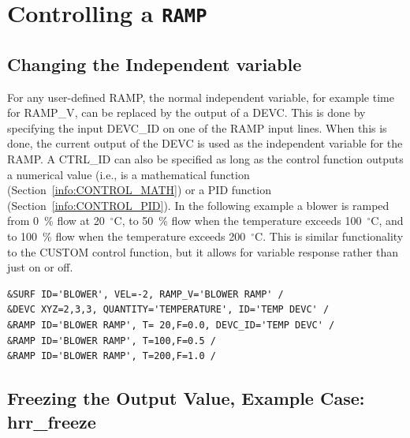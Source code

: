 \documentclass[11pt]{book}
\begin{document}
\section{Controlling a \texorpdfstring{{\tt RAMP}}{RAMP}}

\subsection{Changing the Independent variable}
\label{info:RAMPDEVC}

For any user-defined {\ct RAMP}, the normal independent variable, for example time for {\ct RAMP\_V}, can be replaced by the output of a {\ct DEVC}.
This is done by specifying the input {\ct DEVC\_ID} on one of the {\ct RAMP} input lines.  When this is done, the current output of the {\ct DEVC} is used as the independent variable for the {\ct RAMP}.  A {\ct CTRL\_ID} can also be specified as long as the control function outputs a numerical value (i.e., is a mathematical function (Section~\ref{info:CONTROL_MATH}) or a PID function (Section~\ref{info:CONTROL_PID}).
In the following example a blower is ramped from 0~\% flow at 20~$^\circ$C, to 50~\% flow when the temperature exceeds 100~$^\circ$C, and to 100~\% flow when the temperature exceeds 200~$^\circ$C.
This is similar functionality to the {\ct CUSTOM} control function, but it allows for variable response rather than just on or off.

\begin{lstlisting}
&SURF ID='BLOWER', VEL=-2, RAMP_V='BLOWER RAMP' /
&DEVC XYZ=2,3,3, QUANTITY='TEMPERATURE', ID='TEMP DEVC' /
&RAMP ID='BLOWER RAMP', T= 20,F=0.0, DEVC_ID='TEMP DEVC' /
&RAMP ID='BLOWER RAMP', T=100,F=0.5 /
&RAMP ID='BLOWER RAMP', T=200,F=1.0 /
\end{lstlisting}

\subsection{Freezing the Output Value, Example Case: hrr\_freeze}
\label{info:freeze_device}
\end{document}
